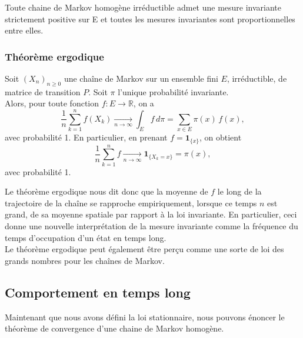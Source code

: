 \documentclass{article}
\begin{document}
\begin{tcolorbox}[colback=white,colframe=blue!80!black,title=Mesures invariantes d'une chaîne de Markov irréductible]
Toute chaine de Markov homogène irréductible admet une mesure invariante strictement positive sur E et toutes les mesures invariantes sont proportionnelles entre elles.
\end{tcolorbox}

\subsubsection{Théorème ergodique}

\begin{tcolorbox}[colback=white,colframe=red!80!black,title=Théorème ergodique (admis)]
Soit $(X_n)_{n \ge 0}$ une chaîne de Markov sur un ensemble fini $E$, irréductible, de matrice de transition $P$. Soit $\pi$ l'unique probabilité invariante. \\

Alors, pour toute fonction $f : E \to \mathbb{R}$, on a
\[
\frac{1}{n} \sum_{k=1}^{n} f(X_k) \xrightarrow[n \to \infty]{} \int_E f \, d\pi = \sum_{x \in E} \pi(x)\, f(x),
\]
avec probabilité 1. En particulier, en prenant $f = \mathbf{1}_{\{x\}}$, on obtient
\[
\frac{1}{n} \sum_{k=1}^{n} f \xrightarrow[n \to \infty]{} \mathbf{1}_{\{X_{k} = x\}} = \pi(x),
\]
avec probabilité 1.
\end{tcolorbox}

Le théorème ergodique nous dit donc que la moyenne de $f$ le long de la trajectoire de la chaîne se rapproche empiriquement, lorsque ce temps $n$ est grand, de sa moyenne spatiale par rapport à la loi invariante. En particulier, ceci donne une nouvelle interprétation de la mesure invariante comme la fréquence du temps d’occupation d’un état en temps long. \\

Le théorème ergodique peut également être perçu comme une sorte de loi des grands nombres pour les chaînes de Markov.

\newpage %
\subsection{Comportement en temps long}

Maintenant que nous avons défini la loi stationnaire, nous pouvons énoncer le théorème de convergence d'une chaine de Markov homogène. \\ %
\end{document}
